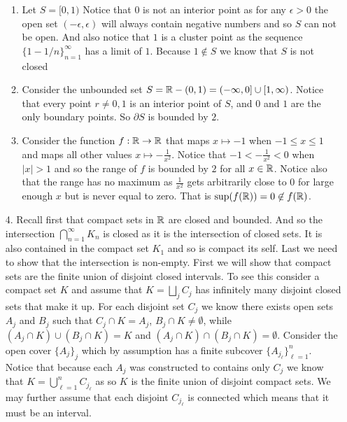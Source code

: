 \documentclass[12pt]{amsart}
\begin{document}
\begin{itemize}
\begin{enumerate}
            \item Let $S=[0,1)$ Notice that $0$ is not an interior point as for any $\epsilon>0$
                  the open set $(-\epsilon,\epsilon)$ will always contain negative numbers and so
                  $S$ can not be open. And also notice that $1$ is a cluster point as the
                  sequence $\{1-1/n\}_{n=1}^\infty$ has a limit of $1$. Because $1\not\in S$ we
                  know that $S$ is not closed

            \item Consider the unbounded set $S=\mathbb{R}-(0,1)=(-\infty,0]\cup [1,\infty)$. Notice that
                  every point $r\neq 0,1$ is an interior point of $S$, and $0$ and $1$ are the
                  only boundary points. So $\partial S$ is bounded by $2$.

            \item Consider the function $f:\mathbb{R}\rightarrow\mathbb{R}$ that maps $x\mapsto -1$ when $-1\leq x\leq 1$
                  and maps all other values $x\mapsto -\frac{1}{x^2}$. Notice that
                  $-1<-\frac{1}{x^2}<0$ when $|x|>1$ and so the range of $f$ is bounded by $2$
                  for all $x\in \mathbb{R}$. Notice also that the range has no maximum as $\frac{1}{x^2}$
                  gets arbitrarily close to $0$ for large enough $x$ but is never equal to zero.
                  That is $\sup(f(\mathbb{R}))=0\not\in f(\mathbb{R})$.
        \end{enumerate}

    \item[4.] Recall first that compact sets in $\mathbb{R}$ are closed and bounded. And so the
        intersection $\bigcap_{n=1}^{\infty} K_n$ is closed as it is the intersection of closed sets. It is 
        also contained in the compact set $K_1$ and so is compact its self. Last we need to
        show that the intersection is non-empty.
        First we will show that compact sets are the finite union of disjoint closed
        intervals. To see this consider a compact set $K$ and assume that $K=\bigsqcup_{j}C_j$ has infinitely many disjoint
        closed sets that make it up. For each disjoint set $C_j$ we know there exists
        open sets $A_j$ and $B_j$ such that $C_j\cap K = A_j$, $B_j\cap K\neq \emptyset$, while
        $(A_j\cap K)\cup(B_j\cap K)= K$ and $(A_j\cap K)\cap(B_j\cap K)=\emptyset$. 
        Consider the open cover $\{A_j\}_j$ which by assumption has a finite
        subcover $\{A_{j_\ell}\}_{\ell=1}^n$. Notice that because each $A_j$ was
        constructed to contains only $C_j$ we know that $K=\bigcup_{\ell=1}^{n} C_{j_\ell}$ 
        as so $K$ is the finite union of disjoint compact sets. We may further
        assume that each disjoint $C_{j_\ell}$ is connected which means that it must be
        an interval.


\end{itemize}
\end{document}
